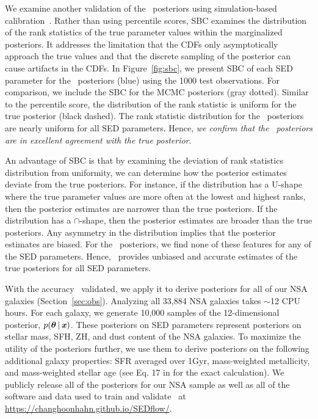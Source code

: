 We examine another validation of the \sedflow~posteriors using simulation-based
calibration~\citep[SBC;][]{talts2020}. 
Rather than using percentile scores, SBC examines the distribution of the rank
statistics of the true parameter values within the marginalized posteriors. 
It addresses the limitation that the CDFs only asymptotically approach the true
values and that the discrete sampling of the posterior can cause artifacts in
the CDFs. 
In Figure~\ref{fig:sbc}, we present SBC of each SED parameter for the
\sedflow~posteriors (blue) using the 1000 test observations.
For comparison, we include the SBC for the MCMC posteriors (gray dotted). 
Similar to the percentile score, the distribution of the rank statistic is
uniform for the true posterior (black dashed). 
The rank statistic distribution for the \sedflow~posteriors are nearly uniform
for all SED parameters. 
Hence, \emph{we confirm that the \sedflow~posteriors are in excellent agreement
with the true posterior}.

An advantage of SBC is that by examining the deviation of rank statistics
distribution from uniformity, we can determine how the posterior estimates
deviate from the true posteriors. 
For instance, if the distribution has a U-shape where the true parameter values
are more often at the lowest and highest ranks, then the posterior estimates
are narrower than the true posteriors.
If the distribution has a $\cap$-shape, then the posterior estimates are
broader than the true posteriors. 
Any asymmetry in the distribution implies that the posterior estimates are
biased.  
For the \sedflow~posteriors, we find none of these features for any of the SED
parameters. 
Hence, \sedflow~provides unbiased and accurate estimates of the true posteriors
for all SED parameters. 

With the accuracy \sedflow~validated, we apply it to derive posteriors for all
of our NSA galaxies (Section~\ref{sec:obs}). 
Analyzing all 33,884 NSA galaxies takes $\sim$12 CPU hours. 
For each galaxy, we generate 10,000 samples of the 12-dimensional posterior,
$p(\boldsymbol{\theta} \,|\, \textbf{\textit{x}})$. 
These posteriors on SED parameters represent posteriors on stellar mass, SFH,
ZH, and dust content of the NSA galaxies. 
To maximize the utility of the posteriors further, we use them to derive
posteriors on the following additional galaxy properties: SFR averaged over
1Gyr, mass-weighted metallicity, and mass-weighted stellar age (see
Eq. 17 in \citealt{hahn2022} for the exact calculation).
We publicly release all of the posteriors for our NSA sample as well as all of
the software and data used to train and validate \sedflow~at 
\url{https://changhoonhahn.github.io/SEDflow/}.
